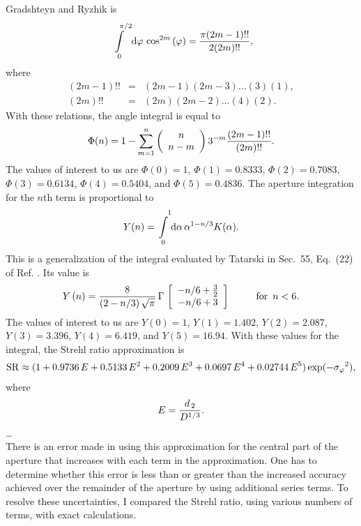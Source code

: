 Gradshteyn  and Ryzhik\cite{8} is
\begin{eqnarray}\int\limits_{\,\,\, 0}^{\,\,\,\,\,\, \pi /  2}{\rm
d\varphi \,}\cos ^{2m}\left( \varphi  \right)={{\pi (2m-1)!!} \over
{2(2m)!!}},\end{eqnarray}   where
\begin{eqnarray}(2m-1)!!&=&(2m-1)(2m-3)\ldots (3)(1), \\
(2m)!!&=&(2m)(2m-2)\ldots (4)(2).\end{eqnarray}  With these
relations, the angle integral is equal to
\begin{eqnarray}\Phi (n)=1-\sum\limits_{m=1}^n {\left(
\begin{array}{c}n \\  n-m \end{array} \right)}\,3^{-m}{{(2m-1)!!}
\over {(2m)!!}}.\end{eqnarray}  The values of interest to us are
$\Phi (0) = 1$, $\Phi (1) = 0.8333$, $\Phi (2) = 0.7083$, $ \Phi
(3) = 0.6134$, $\Phi (4) = 0.5404$, and  $\Phi (5) = 0.4836$.   The
aperture integration for the $n$th term is proportional to
\begin{eqnarray}Y(n)=\int\limits_{\,\,\, 0}^{\,\,\,\,\,\, 1} {\rm d\alpha
\,}\alpha ^{1-n/ 3}K(\alpha ).\end{eqnarray}  This is a
generalization of  the integral evaluated by Tatarski in Sec.\ 55,
Eq.\ (22) of Ref.  .  Its value is
\begin{eqnarray}Y\left( n  \right)={8 \over {(2-n/ 3)\,\sqrt \pi
}}\,\Gamma\,\left[ \begin{array}{c}  -n/ 6+{3 \over 2} \\  { -n/
6+3} \end{array} \right]\,\,\quad\,\,\,\,\,\,\,\, {\rm for}\,\,\,
n<6.\end{eqnarray}  The values of interest to us are  $Y\left( 0
\right)=1$,  $Y\left( 1 \right)=1.402$,  $Y\left( 2 \right)=2.087$,
$Y\left( 3 \right)=3.396$,  $Y\left( 4 \right)=6.419$, and $Y\left(
5 \right)=16.94$.   With these values for  the integral, the Strehl
ratio approximation is  \begin{eqnarray}{\rm SR} \approx
({1+0.9736\,E+0.5133\,E^2+0.2009\,E^3+0.0697\,E^4+0.02744\,E^5}
)\exp ({-\sigma _\varphi }^2),\end{eqnarray}   where
\begin{eqnarray}E={{d_{\,2}} \over  {D^{1/ 3}}}.
\end{eqnarray}
\ldots \\
There is an error made in using this approximation for the central
part  of the aperture that increases with each term in the
approximation.  One  has to determine whether this error is less
than or greater than the  increased accuracy achieved over the
remainder of the aperture by using  additional series terms.  To
resolve these uncertainties, I compared the  Strehl ratio, using
various numbers of terms, with exact calculations.

